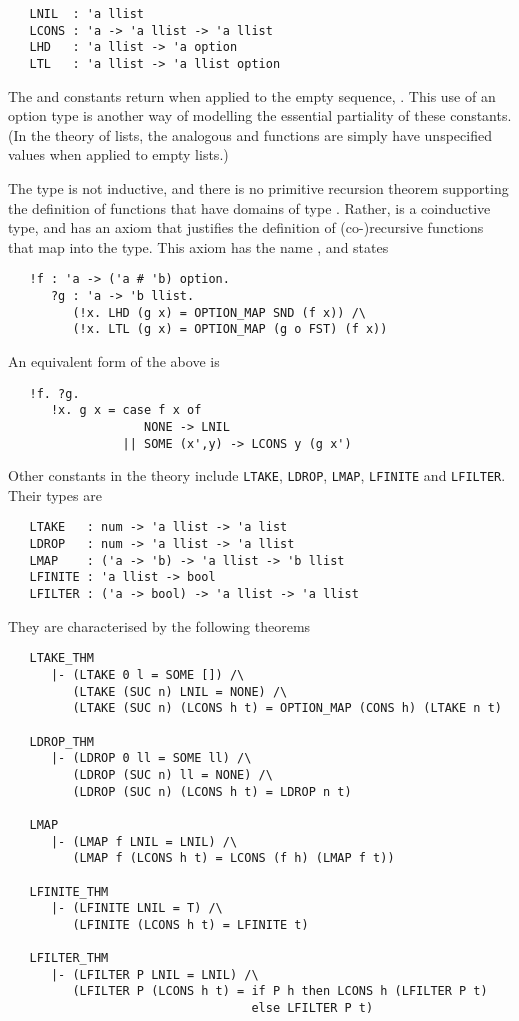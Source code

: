 {\small
\begin{verbatim}
   LNIL  : 'a llist
   LCONS : 'a -> 'a llist -> 'a llist
   LHD   : 'a llist -> 'a option
   LTL   : 'a llist -> 'a llist option
\end{verbatim}
}

The  and  constants return  when applied to
the empty sequence, .  This use of an option type is another
way of modelling the essential partiality of these constants.  (In the
theory of lists, the analogous  and  functions are
simply have unspecified values when applied to empty lists.)

The type  is not inductive, and there is no primitive
recursion theorem supporting the definition of functions that have
domains of type .  Rather,  is a coinductive type,
and has an axiom that justifies the definition of (co-)recursive
functions that map into the  type.  This axiom has the name
, and states
{\small
\begin{verbatim}
   !f : 'a -> ('a # 'b) option.
      ?g : 'a -> 'b llist.
         (!x. LHD (g x) = OPTION_MAP SND (f x)) /\
         (!x. LTL (g x) = OPTION_MAP (g o FST) (f x))
\end{verbatim}
}
\noindent An equivalent form of the above is
{\small
\begin{verbatim}
   !f. ?g.
      !x. g x = case f x of
                   NONE -> LNIL
                || SOME (x',y) -> LCONS y (g x')
\end{verbatim}
}

Other constants in the theory  include \texttt{LTAKE},
\texttt{LDROP}, \texttt{LMAP}, \texttt{LFINITE} and
\texttt{LFILTER}. Their types are
%
{\small
\begin{verbatim}
   LTAKE   : num -> 'a llist -> 'a list
   LDROP   : num -> 'a llist -> 'a llist
   LMAP    : ('a -> 'b) -> 'a llist -> 'b llist
   LFINITE : 'a llist -> bool
   LFILTER : ('a -> bool) -> 'a llist -> 'a llist
\end{verbatim}
}
\noindent They are characterised by the following theorems
{\small
\begin{verbatim}
   LTAKE_THM
      |- (LTAKE 0 l = SOME []) /\
         (LTAKE (SUC n) LNIL = NONE) /\
         (LTAKE (SUC n) (LCONS h t) = OPTION_MAP (CONS h) (LTAKE n t)

   LDROP_THM
      |- (LDROP 0 ll = SOME ll) /\
         (LDROP (SUC n) ll = NONE) /\
         (LDROP (SUC n) (LCONS h t) = LDROP n t)

   LMAP
      |- (LMAP f LNIL = LNIL) /\
         (LMAP f (LCONS h t) = LCONS (f h) (LMAP f t))

   LFINITE_THM
      |- (LFINITE LNIL = T) /\
         (LFINITE (LCONS h t) = LFINITE t)

   LFILTER_THM
      |- (LFILTER P LNIL = LNIL) /\
         (LFILTER P (LCONS h t) = if P h then LCONS h (LFILTER P t)
                                  else LFILTER P t)
\end{verbatim}
}

